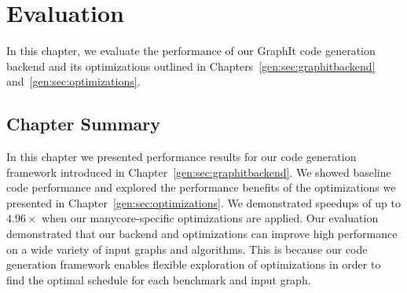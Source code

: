 \chapter{Evaluation}\label{sec:eval}

In this chapter, we evaluate the performance of our GraphIt code generation backend and its optimizations outlined in Chapters~\ref{gen:sec:graphitbackend} and~\ref{gen:sec:optimizations}.




\section{Chapter Summary}

In this chapter we presented performance results for our code generation framework introduced in Chapter~\ref{gen:sec:graphitbackend}.
We showed baseline code performance and explored the performance benefits of the optimizations we presented in Chapter~\ref{gen:sec:optimizations}.
We demonstrated speedups of up to $4.96\times$ when our manycore-specific optimizations are applied.
Our evaluation demonstrated that our \graphit backend and optimizations can improve high performance on a wide variety of input graphs and algorithms.
This is because our code generation framework enables flexible exploration of optimizations in order to find the optimal schedule for each benchmark and input graph.